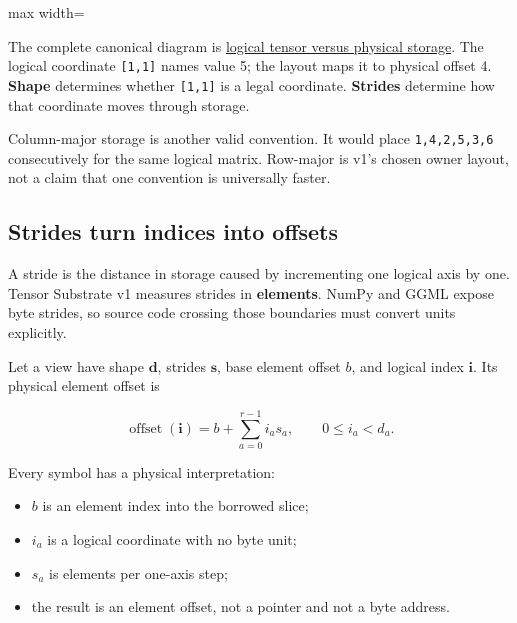 \documentclass[
  10pt,
]{article}
\providecommand{\tightlist}{%
  \setlength{\itemsep}{0pt}\setlength{\parskip}{0pt}}
\begin{document}
\begin{center}\begin{adjustbox}{max width=\linewidth}\end{adjustbox}\end{center}

The complete canonical diagram is
\href{https://github.com/hermonai/inside-the-llm-engine/blob/astra-visual-rewrite/diagrams/tensor/logical-vs-physical.txt}{logical
tensor versus physical storage}. The logical coordinate
\texttt{{[}1,1{]}} names value 5; the layout maps it to physical offset
4. \textbf{Shape} determines whether \texttt{{[}1,1{]}} is a legal
coordinate. \textbf{Strides} determine how that coordinate moves through
storage.

Column-major storage is another valid convention. It would place
\texttt{1,4,2,5,3,6} consecutively for the same logical matrix.
Row-major is v1's chosen owner layout, not a claim that one convention
is universally faster.

\subsection{Strides turn indices into
offsets}\label{strides-turn-indices-into-offsets}

A stride is the distance in storage caused by incrementing one logical
axis by one. Tensor Substrate v1 measures strides in \textbf{elements}.
NumPy and GGML expose byte strides, so source code crossing those
boundaries must convert units explicitly.

Let a view have shape \(\mathbf d\), strides \(\mathbf s\), base element
offset \(b\), and logical index \(\mathbf i\). Its physical element
offset is

\[
\operatorname{offset}(\mathbf i)
= b + \sum_{a=0}^{r-1} i_a s_a,
\qquad 0 \le i_a < d_a.
\]

Every symbol has a physical interpretation:

\begin{itemize}
\tightlist
\item
  \(b\) is an element index into the borrowed slice;
\item
  \(i_a\) is a logical coordinate with no byte unit;
\item
  \(s_a\) is elements per one-axis step;
\item
  the result is an element offset, not a pointer and not a byte address.
\end{itemize}
\end{document}
